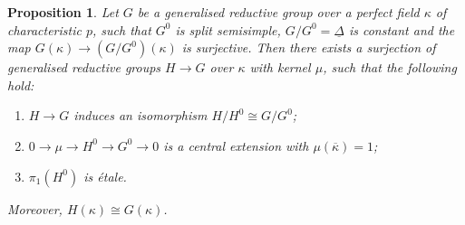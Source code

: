 \documentclass{amsart}
\newtheorem{prop}{Proposition}[section]
\theoremstyle{definition}
\theoremstyle{remark}
\begin{document}
\begin{prop}\label{letter_bcnrd}
    Let $G$ be a generalised reductive group over a perfect field $\kappa$ of characteristic $p$, such that $G^0$ is split semisimple, $G/G^0=\underline{\Delta}$ is constant and the map $G(\kappa)\rightarrow (G/G^0)(\kappa)$ is surjective. 
    Then there exists a surjection of generalised reductive groups $H \to G$ over $\kappa$ with kernel $\mu$, such that the following hold:
    \begin{enumerate}
        \item $H \to G$ induces an isomorphism $H/H^0 \cong G/G^0$;
        \item $0 \to \mu \to H^0 \to G^0 \to 0$ is a central extension with $\mu(\overline{\kappa})=1$;
        \item $\pi_1(H^0)$ is \'etale.
    \end{enumerate}
    Moreover, $H(\kappa) \cong G(\kappa)$.
\end{prop}
\end{document}
